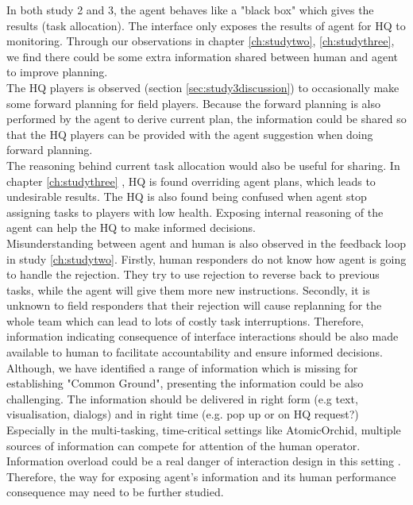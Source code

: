 In both study 2 and 3, the agent behaves like a "black box" which gives the results (task allocation). The interface only exposes the results of agent for HQ to monitoring. Through our observations in chapter \ref{ch:studytwo}, \ref{ch:studythree}, we find there could be some extra information shared between human and agent to improve planning.\\

The HQ players is observed (section \ref{sec:study3discussion}) to occasionally make some forward planning for field players. Because the forward planning is also performed by the agent to derive current plan, the information could be shared so that the HQ players can be provided with the agent suggestion when doing forward planning.\\

The reasoning behind current task allocation would also be useful for sharing. In chapter \ref{ch:studythree} , HQ is found overriding agent plans, which leads to undesirable results. The HQ is also found being confused when agent stop assigning tasks to players with low health. Exposing internal reasoning of the agent can help the HQ to make informed decisions. \\

Misunderstanding between agent and human is also observed in the feedback loop in study \ref{ch:studytwo}. Firstly, human responders do not know how agent is going to handle the rejection. They try to use rejection to reverse back to previous tasks, while the agent will give them more new instructions. Secondly, it is unknown to field responders that their rejection will cause replanning for the whole team which can lead to lots of costly task interruptions. Therefore, information indicating consequence of interface interactions should be also made available to human to facilitate accountability and ensure informed decisions. \\

Although, we have identified a range of information which is missing for establishing "Common Ground", presenting the information could be also challenging. The information should be delivered in right form (e.g text, visualisation, dialogs) and in right time (e.g. pop up or on HQ request?) \cite{Carver2007} Especially in the multi-tasking, time-critical settings like AtomicOrchid, multiple sources of information can compete for attention of the human operator. Information overload could be a real danger of interaction design in this setting \cite{Lieberman2003}. Therefore, the  way for exposing agent's information and its human performance consequence may need to be further studied.   \\


